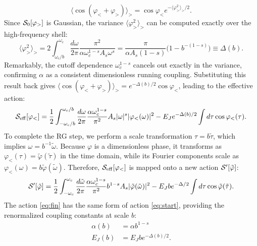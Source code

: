 \documentclass[aps,notitlepage,twocolumn,prl,nolongbibliography,superscriptaddress]{revtex4-2}
\begin{document}
\begin{equation}
    \bigl \langle \cos(\varphi_< + \varphi_>)  \bigr \rangle_> = \cos \varphi_< e^{-\langle\varphi^2_>\rangle_>/2}.
\end{equation}
Since ${\cal S}_0[\varphi_>]$ is Gaussian, the variance $\langle \varphi^2_>\rangle_>$ can be computed exactly over the high-frequency shell:
\begin{equation}
    \langle \varphi^2_>\rangle_> = 2 \int_{\omega_c/b}^{\omega_c} \frac{d\omega}{2\pi} \frac{\pi^2}{\alpha \omega_c^{1-s} A_s \omega^s} = \frac{\pi}{\alpha A_s (1-s)} \bigl (1-b^{-(1-s)}\bigr) \equiv \Delta(b).
\end{equation}
Remarkably, the cutoff dependence $\omega_c^{1-s}$ cancels out exactly in the variance, confirming $\alpha$ as a consistent dimensionless running coupling. Substituting this result back gives $\bigl \langle \cos(\varphi_< + \varphi_>)  \bigr \rangle_> = e^{-\Delta(b)/2} \cos \varphi_<$, leading to the effective action:
\begin{equation}
    {\cal S}_{\mathrm{eff}}[\varphi_<] = \frac{1}{2} \int_{-\omega_c/b}^{\omega_c/b} \frac{d\omega}{2\pi} \frac{\alpha \omega_c^{1-s}}{\pi^2} A_s |\omega|^s |\varphi_<(\omega)|^2 - E_J e^{-\Delta(b)/2} \int d\tau \cos \varphi_<(\tau).
\end{equation}
To complete the RG step, we perform a scale transformation $\tau = b{\tilde \tau}$, which implies $\omega = b^{-1}{\tilde \omega}$. Because $\varphi$ is a dimensionless phase, it transforms as $\varphi_<(\tau) = {\tilde \varphi}({\tilde \tau})$ in the time domain, while its Fourier components scale as $\varphi_<(\omega) = b{\tilde \varphi}({\tilde \omega})$. Therefore, ${\cal S}_{\mathrm{eff}}[\varphi_<]$ is mapped onto a new action ${\cal S}'[{\tilde \varphi}]$:
\begin{equation}\label{eq:fin}
    {\cal S}'[{\tilde \varphi}] = \frac{1}{2} \int_{-\omega_c}^{\omega_c} \frac{d{\tilde \omega}}{2\pi}  \frac{\alpha \omega_c^{1-s}}{\pi^2} b^{1-s} A_s |\tilde \varphi(\tilde \omega)|^2 - E_J b e^{-\Delta/2} \int d\tau \cos \tilde \varphi (\tilde \tau).
\end{equation}
The action \eqref{eq:fin} has the same form of action \eqref{eq:start}, providing the renormalized coupling constants at scale $b$:
\begin{equation}\begin{split}
    \alpha (b) &= \alpha b^{1-s}\\
    E_J(b) &= E_J b e^{-\Delta(b)/2}.
\end{split}
\end{equation}
\end{document}
